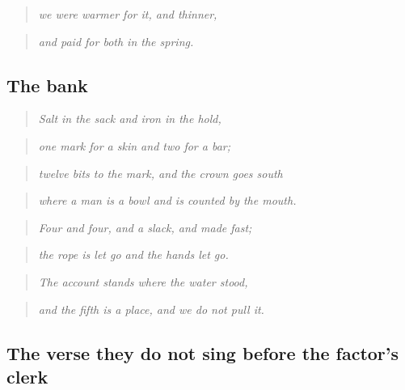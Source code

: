 \documentclass{design/chronicle}
\begin{document}
\begin{quote}\itshape we were warmer for it, and thinner,\end{quote}

\begin{quote}\itshape and paid for both in the spring.\end{quote}

\subsection*{The bank}

\begin{quote}\itshape Salt in the sack and iron in the hold,\end{quote}

\begin{quote}\itshape one mark for a skin and two for a bar;\end{quote}

\begin{quote}\itshape twelve bits to the mark, and the crown goes south\end{quote}

\begin{quote}\itshape where a man is a bowl and is counted by the mouth.\end{quote}

\begin{quote}\itshape \end{quote}

\begin{quote}\itshape Four and four, and a slack, and made fast;\end{quote}

\begin{quote}\itshape the rope is let go and the hands let go.\end{quote}

\begin{quote}\itshape The account stands where the water stood,\end{quote}

\begin{quote}\itshape and the fifth is a place, and we do not pull it.\end{quote}

\subsection*{The verse they do not sing before the factor’s clerk}
\end{document}
